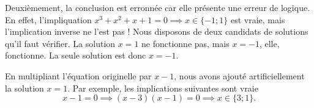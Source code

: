 {\begin{enumerate}
		Deuxièmement, la conclusion est erronnée car elle présente une erreur de logique.
		En effet, l'impliquation $x^3 + x^2 + x + 1 = 0 \implies x \in \{-1 ; 1\}$ est vraie, mais l'implication inverse ne l'est pas !
		Nous disposons de deux candidats de solutions qu'il faut vérifier. La solution $x=1$ ne fonctionne pas, mais $x=-1$, elle, fonctionne.
		La seule solution est donc $x=-1$.
		
		En multipliant l'équation originelle par $x-1$, nous avons ajouté artificiellement la solution $x=1$.
		Par exemple, les implications suivantes sont vraie
			\[ x - 1 = 0 \implies (x-3)(x-1) = 0 \implies x \in \{3 ; 1\}. \]
	\end{enumerate}
}

